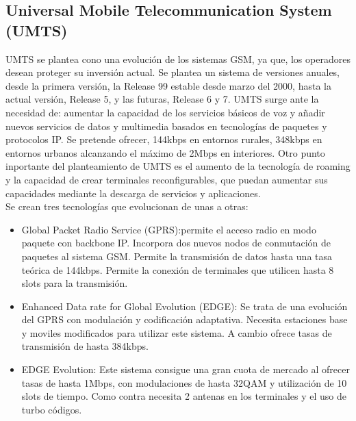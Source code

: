 \subsection{Universal Mobile Telecommunication System (UMTS)}
\label{sub:UMTS}
UMTS se plantea cono una evolución de los sistemas GSM, ya que, los operadores desean proteger su inversión actual. Se plantea un sistema de versiones anuales, desde la primera versión, la Release 99 estable desde marzo del 2000, hasta la actual versión, Release 5, y las futuras, Release 6 y 7. UMTS surge ante la necesidad de: aumentar la capacidad de los servicios básicos de voz y añadir nuevos servicios de datos y multimedia basados en tecnologías de paquetes y protocolos IP. Se pretende ofrecer, 144kbps en entornos rurales, 348kbps en entornos urbanos alcanzando el máximo de 2Mbps en interiores. Otro punto inportante del planteamiento de UMTS es el aumento de la tecnología de roaming y la capacidad de crear terminales reconfigurables, que puedan aumentar sus capacidades mediante la descarga de servicios y aplicaciones.\\
Se crean tres tecnologías que evolucionan de unas a otras:
\begin{itemize}
	\item Global Packet Radio Service (GPRS):permite el acceso radio en modo paquete con backbone IP. Incorpora dos nuevos nodos de conmutación de paquetes al sistema GSM. Permite la transmisión de datos hasta una tasa teórica de 144kbps. Permite la conexión de terminales que utilicen hasta 8 slots para la transmisión.
	\item Enhanced Data rate for Global Evolution (EDGE): Se trata de una evolución del GPRS con modulación y codificación adaptativa. Necesita estaciones base y moviles modificados para utilizar este sistema. A cambio ofrece tasas de transmisión de hasta 384kbps.
	\item EDGE Evolution: Este sistema consigue una gran cuota de mercado al ofrecer tasas de hasta 1Mbps, con modulaciones de hasta 32QAM y utilización de 10 slots de tiempo. Como contra necesita 2 antenas en los terminales y el uso de turbo códigos.
\end{itemize}
